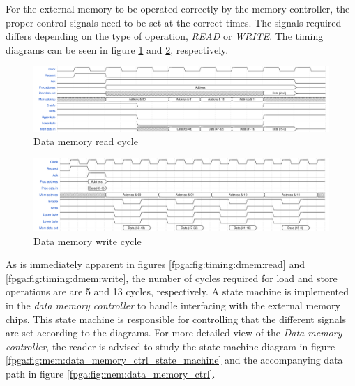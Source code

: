 For the external memory to be operated correctly by the memory controller, the proper control signals need to be set at the correct times. The signals required differs depending on the type of operation, \emph{READ} or \emph{WRITE}. The timing diagrams can be seen in figure \ref{fpga:fig:timing:dmem:read} and \ref{fpga:fig:timing:dmem:write}, respectively. 


\begin{figure}[H]
  \centering
  \includegraphics[width=\textwidth]{fpga/fig/timing/data_mem_read.pdf}
  \caption{Data memory read cycle}
  \label{fpga:fig:timing:dmem:read}
\end{figure}

\begin{figure}[H]
  \centering
  \includegraphics[width=\textwidth]{fpga/fig/timing/data_mem_write.pdf}
  \caption{Data memory write cycle}
  \label{fpga:fig:timing:dmem:write}
\end{figure}

As is immediately apparent in figures \vref{fpga:fig:timing:dmem:read} and \vref{fpga:fig:timing:dmem:write}, the number of cycles required for load and store operations are are 5 and 13 cycles, respectively.
A state machine is implemented in the \emph{data memory controller} to handle interfacing with the external memory chips.
This state machine is responsible for controlling that the different signals are set according to the diagrams.
For more detailed view of the \emph{Data memory controller}, the reader is advised to study the state machine diagram in figure \ref{fpga:fig:mem:data_memory_ctrl_state_machine} and the accompanying data path in figure \ref{fpga:fig:mem:data_memory_ctrl}.

